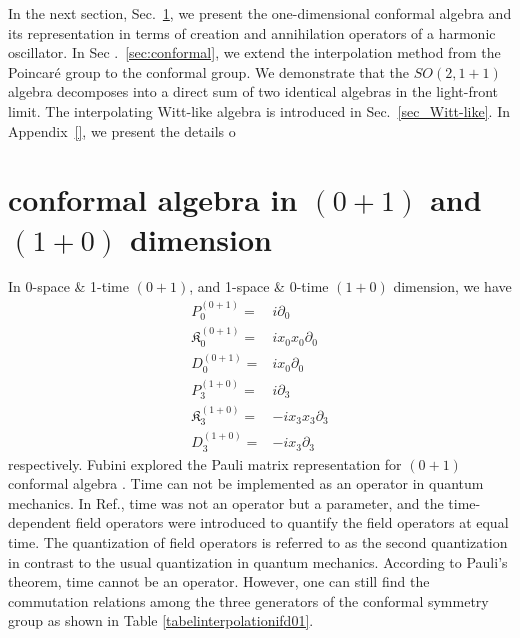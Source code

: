 \documentclass[%
 reprint,
superscriptaddress,
 amsmath,amssymb,
 aps,
]{revtex4-2}
\begin{document}
In the next section, Sec.~\ref{sec:conformal0110}, we present the one-dimensional conformal algebra and its representation in terms of creation and annihilation operators of a harmonic oscillator. In Sec .~\ref{sec:conformal}, we extend the interpolation method from the Poincar\'e group to the conformal group. We demonstrate that the $SO(2, 1 + 1)$ algebra decomposes into a direct sum of two identical algebras in the light-front limit. The interpolating Witt-like algebra is introduced in Sec.~\ref{sec_Witt-like}. 
In Appendix~\ref{}, 
we present the details o



\section{conformal algebra in \texorpdfstring{$(0+1)$}
{Lg} and \texorpdfstring{$(1+0)$}{Lg} dimension}
\label{sec:conformal0110}

 In 0-space \& 1-time $(0+1)$, and 1-space \& 0-time $(1+0)$ dimension, we have
\begin{align}
    P^{(0+1)}_{0}=&i\partial_{0}\\
    \mathfrak{K}^{(0+1)}_{{0}}=&ix_{0}x_{0}\partial_{{0}}\\
    D^{(0+1)}_{0}=&ix_{0}\partial_{0}\\
    P^{(1+0)}_{3}=&i\partial_{3}\\
    \mathfrak{K}^{(1+0)}_{{3}}=&-ix_{3}x_{3}\partial_{{3}}\\
    D^{(1+0)}_{3}=&-ix_{3}\partial_{3}\label{0110xpartial}
\end{align}
respectively. Fubini explored the Pauli matrix representation for $(0+1)$ conformal algebra \cite{Fubini1976}. Time can not be implemented as an operator in quantum mechanics. In Ref.\cite{Fubini1976}, time was not an operator but a parameter, and the time-dependent field operators were introduced to quantify the field operators at equal time. The quantization of field operators is referred to as the second quantization in contrast to the usual quantization in quantum mechanics. According to Pauli's theorem\cite{Galapon1999}, time cannot be an operator. However, one can still find the commutation relations among the three generators of the conformal symmetry group as shown in Table \ref{tabelinterpolationifd01}. 
\end{document}
